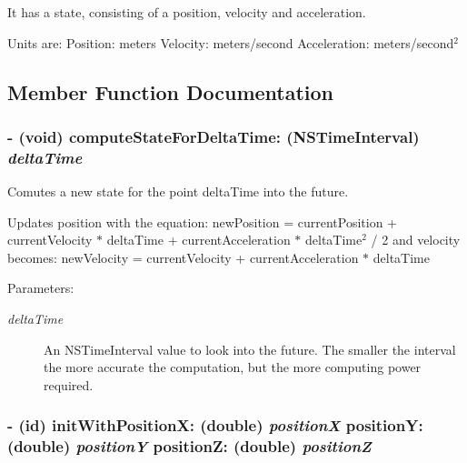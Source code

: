 It has a state, consisting of a position, velocity and acceleration.

Units are: Position: meters Velocity: meters/second Acceleration: meters/second$^{\mbox{2}}$  

\subsection{Member Function Documentation}
\hypertarget{interface_i_m_s_r_point_object_ae14396d83b2edd2f34b0bfb0f35a501}{
\subsubsection[{computeStateForDeltaTime:}]{\setlength{\rightskip}{0pt plus 5cm}- (void) computeStateForDeltaTime: (NSTimeInterval) {\em deltaTime}}}
\label{interface_i_m_s_r_point_object_ae14396d83b2edd2f34b0bfb0f35a501}


Comutes a new state for the point deltaTime into the future. 

Updates position with the equation: newPosition = currentPosition + currentVelocity $\ast$ deltaTime + currentAcceleration $\ast$ deltaTime$^{\mbox{2}}$  / 2 and velocity becomes: newVelocity = currentVelocity + currentAcceleration $\ast$ deltaTime

\begin{Desc}
\item[Parameters:]
\begin{description}
\item[{\em deltaTime}]An NSTimeInterval value to look into the future. The smaller the interval the more accurate the computation, but the more computing power required. \end{description}
\end{Desc}
\hypertarget{interface_i_m_s_r_point_object_603d5f56f6b9344693f108efa3786d79}{
\subsubsection[{initWithPositionX:positionY:positionZ:}]{\setlength{\rightskip}{0pt plus 5cm}- (id) initWithPositionX: (double) {\em positionX}\/ positionY: (double) {\em positionY}\/ positionZ: (double) {\em positionZ}}}
\label{interface_i_m_s_r_point_object_603d5f56f6b9344693f108efa3786d79}


